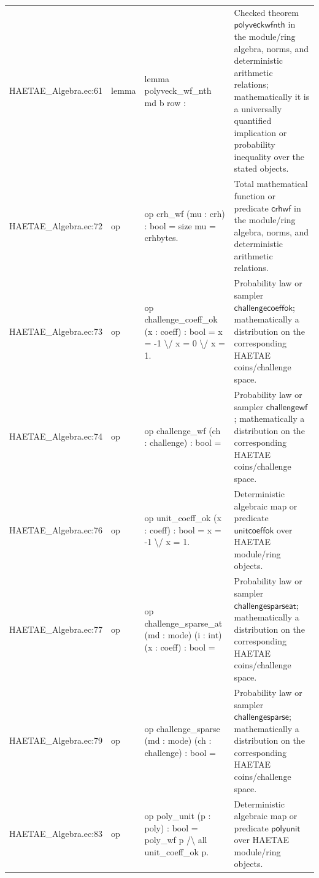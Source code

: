 \documentclass[10pt]{article}
\begin{document}
\begin{longtable}{L{0.11\textwidth}L{0.055\textwidth}L{0.385\textwidth}L{0.41\textwidth}}
HAETAE\_\allowbreak{}Algebra.\allowbreak{}ec:\allowbreak{}61 & lemma & {\ttfamily\scriptsize lemma polyveck\_\allowbreak{}wf\_\allowbreak{}nth md b row :} & Checked theorem $\mathsf{polyveckwfnth}$ in the module/ring algebra, norms, and deterministic arithmetic relations; mathematically it is a universally quantified implication or probability inequality over the stated objects. \\
HAETAE\_\allowbreak{}Algebra.\allowbreak{}ec:\allowbreak{}72 & op & {\ttfamily\scriptsize op crh\_\allowbreak{}wf (mu : crh) : bool = size mu = crhbytes.} & Total mathematical function or predicate $\mathsf{crhwf}$ in the module/ring algebra, norms, and deterministic arithmetic relations. \\
HAETAE\_\allowbreak{}Algebra.\allowbreak{}ec:\allowbreak{}73 & op & {\ttfamily\scriptsize op challenge\_\allowbreak{}coeff\_\allowbreak{}ok (x : coeff) : bool = x = -1 \textbackslash{}/ x = 0 \textbackslash{}/ x = 1.} & Probability law or sampler $\mathsf{challengecoeffok}$; mathematically a distribution on the corresponding HAETAE coins/challenge space. \\
HAETAE\_\allowbreak{}Algebra.\allowbreak{}ec:\allowbreak{}74 & op & {\ttfamily\scriptsize op challenge\_\allowbreak{}wf (ch : challenge) : bool =} & Probability law or sampler $\mathsf{challengewf}$; mathematically a distribution on the corresponding HAETAE coins/challenge space. \\
HAETAE\_\allowbreak{}Algebra.\allowbreak{}ec:\allowbreak{}76 & op & {\ttfamily\scriptsize op unit\_\allowbreak{}coeff\_\allowbreak{}ok (x : coeff) : bool = x = -1 \textbackslash{}/ x = 1.} & Deterministic algebraic map or predicate $\mathsf{unitcoeffok}$ over HAETAE module/ring objects. \\
HAETAE\_\allowbreak{}Algebra.\allowbreak{}ec:\allowbreak{}77 & op & {\ttfamily\scriptsize op challenge\_\allowbreak{}sparse\_\allowbreak{}at (md : mode) (i : int) (x : coeff) : bool =} & Probability law or sampler $\mathsf{challengesparseat}$; mathematically a distribution on the corresponding HAETAE coins/challenge space. \\
HAETAE\_\allowbreak{}Algebra.\allowbreak{}ec:\allowbreak{}79 & op & {\ttfamily\scriptsize op challenge\_\allowbreak{}sparse (md : mode) (ch : challenge) : bool =} & Probability law or sampler $\mathsf{challengesparse}$; mathematically a distribution on the corresponding HAETAE coins/challenge space. \\
HAETAE\_\allowbreak{}Algebra.\allowbreak{}ec:\allowbreak{}83 & op & {\ttfamily\scriptsize op poly\_\allowbreak{}unit (p : poly) : bool = poly\_\allowbreak{}wf p /\textbackslash{} all unit\_\allowbreak{}coeff\_\allowbreak{}ok p.} & Deterministic algebraic map or predicate $\mathsf{polyunit}$ over HAETAE module/ring objects. \\

\end{longtable}
\end{document}
